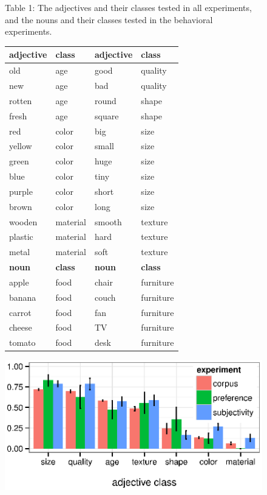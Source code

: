 \documentclass[12pt]{article}
\begin{document}
\begin{figure}
	Table 1: The adjectives and their classes tested in all experiments, and the nouns and their classes tested in the behavioral experiments. \\
	{\footnotesize \begin{tabular}{llll}
		\textbf{adjective}	&	\textbf{class}	&	\textbf{adjective}	&	\textbf{class}	\\ \hline
		old	&	age	&	good	&	quality	\\
		new	&	age	&	bad	&	quality	\\
		rotten	&	age	&	round	&	shape	\\
		fresh	&	age	&	square	&	shape	\\
		red	&	color	&	big	&	size	\\
		yellow	&	color	&	small	&	size	\\
		green	&	color	&	huge	&	size	\\
		blue	&	color	&	tiny	&	size	\\
		purple	&	color	&	short	&	size	\\
		brown	&	color	&	long	&	size	\\
		wooden	&	material	&	smooth	&	texture	\\
		plastic	&	material	&	hard	&	texture	\\
		metal	&	material	&	soft	&	texture	\\
		\textbf{noun}	&	\textbf{class}	&	\textbf{noun}	&	\textbf{class}	\\ \hline
		apple	&	food	&	chair	&	furniture	\\
		banana	&	food	&	couch	&	furniture	\\
		carrot	&	food	&	fan	&	furniture	\\
		cheese	&	food	&	TV	&	furniture	\\
		tomato	&	food	&	desk	&	furniture	
	\end{tabular}}
	\vspace{-10pt}
	\begin{center}
		\includegraphics[width=\linewidth]{plots/expt_results.eps}

\end{center}
\end{figure}
\end{document}
